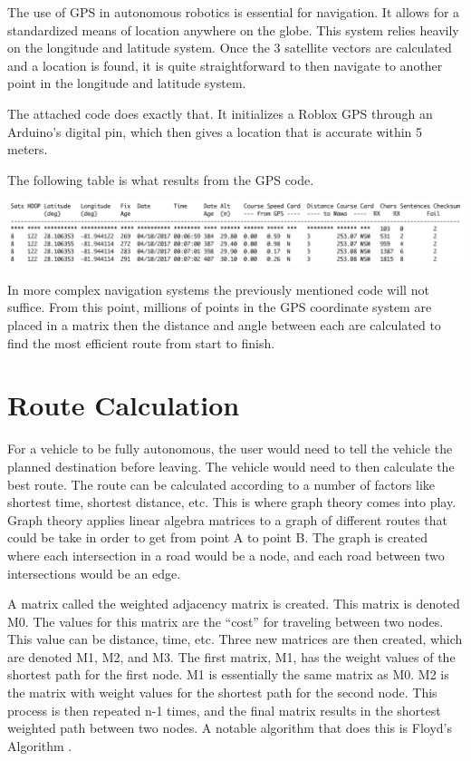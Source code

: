 \documentclass[12pt]{article}
\begin{document}
The use of GPS in autonomous robotics is essential for navigation. It allows for a standardized means of location anywhere on the globe. This system relies heavily on the longitude and latitude system. Once the 3 satellite vectors are calculated and a location is found, it is quite straightforward to then navigate to another point in the longitude and latitude system.\newline

The attached code does exactly that\cite{tinyGPS}. It initializes a Roblox GPS through an Arduino's digital pin, which then gives a location that is accurate within 5 meters. \newline

The following table is what results from the GPS code.


		\begin{center}
			\includegraphics[width=1\textwidth]{table}
		\end{center}


In more complex navigation systems the previously mentioned code will not suffice. From this point, millions of points in the GPS coordinate system are placed in a matrix then the distance and angle between each are calculated to find the most efficient route from start to finish.

\section{Route Calculation}
\quad For a vehicle to be fully autonomous, the user would need to tell the vehicle the planned destination before leaving. The vehicle would need to then calculate the best route. The route can be calculated according to a number of factors like shortest time, shortest distance, etc. This is where graph theory comes into play. Graph theory applies linear algebra matrices to a graph of different routes that could be take in order to get from point A to point B. The graph is created where each intersection in a road would be a node, and each road between two intersections would be an edge\cite{shortRoute}.\newline

A matrix called the weighted adjacency matrix is created. This matrix is denoted M0. The values for this matrix are the “cost” for traveling between two nodes. This value can be distance, time, etc. Three new matrices are then created, which are denoted M1, M2, and M3. The first matrix, M1, has the weight values of the shortest path for the first node. M1 is essentially the same matrix as M0. M2 is the matrix with weight values for the shortest path for the second node. This process is then repeated n-1 times, and the final matrix results in the shortest weighted path between two nodes. A notable algorithm that does this is Floyd’s Algorithm \cite{shortRoute}.\newline
\end{document}
